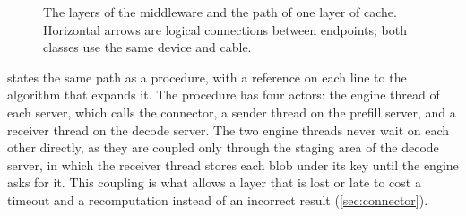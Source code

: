 \begin{figure}[htbp]
  \caption[The layers of the middleware and the path of one layer of cache]{The layers of the middleware and the path of one layer of cache. Horizontal arrows are logical connections between endpoints; both classes use the same device and cable.}
  \label{fig:architecture}
\end{figure}

 states the same path as a procedure, with a reference on
each line to the algorithm that expands it. The procedure has four actors:
the engine thread of each server, which calls the connector, a sender thread
on the prefill server, and a receiver thread on the decode server. The two
engine threads never wait on each other directly, as they are coupled only
through the staging area of the decode server, in which the receiver thread
stores each blob under its key until the engine asks for it. This coupling is
what allows a layer that is lost or late to cost a timeout and a
recomputation instead of an incorrect result (\cref{sec:connector}).

